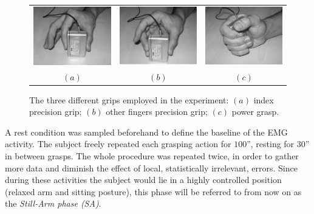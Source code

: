\begin{figure}[!t] \centering
  \begin{tabular}{ccc}
   \includegraphics[height=0.16\textheight]{figs/grip1} &
    \includegraphics[height=0.16\textheight]{figs/grip2} &
    \includegraphics[height=0.16\textheight]{figs/grip3} \\
    $(a)$ & $(b)$ & $(c)$ \\
  \end{tabular}
  \caption{The three different grips employed in the experiment: $(a)$
   index precision grip; $(b)$ other fingers precision grip; $(c)$
   power grasp.}
  \label{fig:Grasps}
\end{figure}

A rest condition was sampled beforehand to define the baseline of the
EMG activity. The subject freely repeated each grasping action for
$100$'', resting for $30$'' in between grasps. The whole procedure was
repeated twice, in order to gather more data and diminish the effect
of local, statistically irrelevant, errors. Since during these
activities the subject would lie in a highly controlled position
(relaxed arm and sitting posture), this phase will
be referred to from now on as the \emph{Still-Arm phase (SA)}.

